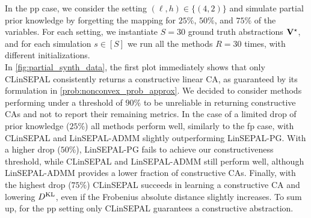 In the pp case, we consider the setting $(\ell,h)\in \{(4,2)\}$ and simulate partial prior knowledge by forgetting the mapping for $25\%$, $50\%$, and $75\%$ of the variables. For each setting, we instantiate $S=30$ ground truth abstractions $\mathbf{V}^\star$, and for each simulation $s \in [S]$ we run all the methods $R=30$ times, with different initializations.\\
In \cref{fig:partial_synth_data}, the first plot immediately shows that only CLinSEPAL consistently returns a constructive linear CA, as guaranteed by its formulation in \cref{prob:nonconvex_prob_approx}. 
We decided to consider methods performing under a threshold of $90\%$ to be unreliable in returning constructive CAs and not to report their remaining metrics.
In the case of a limited drop of prior knowledge ($25\%$) all methods perform well, similarly to the fp case, with CLinSEPAL and LinSEPAL-ADMM slightly outperforming LinSEPAL-PG.
With a higher drop ($50\%$), LinSEPAL-PG fails to achieve our constructiveness threshold, while CLinSEPAL and LinSEPAL-ADMM still perform well, although LinSEPAL-ADMM provides a lower fraction of constructive CAs. 
Finally, with the highest drop ($75\%$) CLinSEPAL succeeds in learning a constructive CA and lowering $D^{\mathrm{KL}}_{}$, even if the Frobenius absolute distance slightly increases. 
To sum up, for the pp setting only CLinSEPAL guarantees a constructive abstraction.